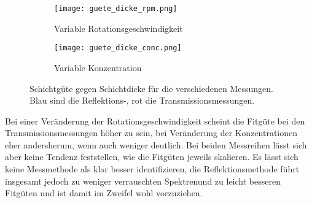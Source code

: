 \begin{figure}[h!]
  \centering
  \begin{subfigure}{.5\textwidth}
    \centering
    \texttt{[image: guete\_dicke\_rpm.png]}
    \caption{Variable Rotationsgeschwindigkeit}
    \label{fig:guete_rpm}
  \end{subfigure}%
  \begin{subfigure}{.5\textwidth}
    \centering
    \texttt{[image: guete\_dicke\_conc.png]}
    \caption{Variable Konzentration}
    \label{fig:guete_conc}
  \end{subfigure}
  \caption{Schichtgüte gegen Schichtdicke für die verschiedenen Messungen. Blau sind die Reflektions-, rot die Transmissionsmessungen.}
  \label{fig:guete_spektren}
\end{figure}

Bei einer Veränderung der Rotationsgeschwindigkeit scheint die Fitgüte bei den Transmissionsmessungen höher zu sein, bei Veränderung der Konzentrationen eher andersherum, wenn auch weniger deutlich. Bei beiden Messreihen lässt sich aber keine Tendenz feststellen, wie die Fitgüten jeweils skalieren. Es lässt sich keine Messmethode als klar besser identifizieren, die Reflektionsmethode führt insgesamt jedoch zu weniger verrauschten Spektrenund zu leicht besseren Fitgüten und ist damit im Zweifel wohl vorzuziehen.